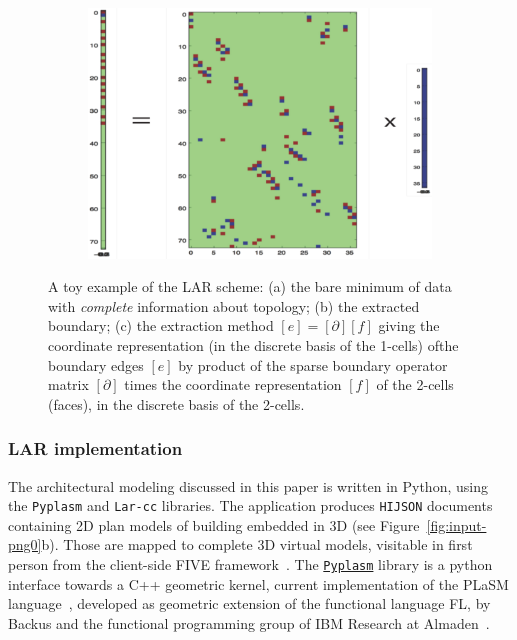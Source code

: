 \documentclass[]{egpubl}
\begin{document}
\begin{figure}[!h]
\begin{subfigure}[b]{0.48\linewidth}
  \caption{}
  \vspace*{4mm}
  \end{subfigure}
 \\
  \begin{subfigure}[b]{0.74\linewidth}
  \centering
  \includegraphics[width=\textwidth]{images/boundary}
  \caption{}
  \end{subfigure}
 
  \caption{A toy example of the LAR scheme: (a) the bare minimum of data with \emph{complete} information about topology; (b) the extracted boundary; (c) the extraction method $[e] = [\partial][f]$ giving the coordinate representation (in the discrete basis of the 1-cells) ofthe boundary edges $[e]$ by product of the sparse boundary operator matrix $[\partial]$ times the coordinate representation $[f]$ of the 2-cells (faces), in the discrete basis of the 2-cells.}
  \label{fig:minimum-data}
 \end{figure}


\subsubsection*{LAR implementation} 

The architectural modeling discussed in this paper is written in Python, using the \texttt{Pyplasm} and \texttt{Lar-cc} libraries.
The application produces \texttt{HIJSON} documents containing 2D plan models of building embedded in 3D (see Figure~\ref{fig:input-png0}b). Those are mapped to complete  3D virtual models, visitable in first person from the client-side  FIVE framework~\cite{Sportillo:2015,Virgadamo:2015}.
The \href{https://github.com/plasm-language/pyplasm}{\texttt{Pyplasm}}  library is a python interface towards a C++ geometric kernel, current implementation of the  PLaSM language~\cite{Paoluzzi:1995:GPP:212332.212349,Paoluzzi2003a}, developed as geometric extension of the functional language FL, by Backus and the functional programming group of IBM Research at Almaden~\cite{Aiken91thefl,fl-1,backus:78}. 
\end{document}
